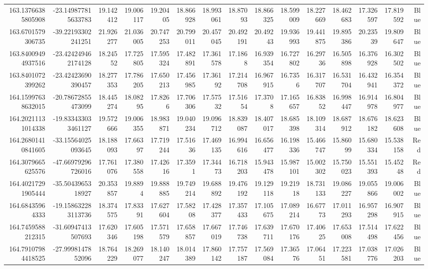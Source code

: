 \begin{center}
\begin{longtable}{rrrrrrrrrrrrrrr}
163.13766385805908 & -23.149877815633783 & 19.142412 & 19.006117 & 19.20405 & 18.866928 & 18.993061 & 18.87093 & 18.866325 & 18.599009 & 18.227669 & 18.462683 & 17.326597 & 17.819592 & Blue \\
163.6701579306735 & -39.22193302241251 & 21.926277 & 21.036005 & 20.747253 & 20.799011 & 20.457045 & 20.492191 & 20.49243 & 19.936993 & 19.441875 & 19.895386 & 20.23539 & 19.809647 & Blue \\
163.84009494937516 & -23.424249462174128 & 18.24552 & 17.725805 & 17.595324 & 17.482891 & 17.361578 & 17.1868 & 16.939354 & 16.727802 & 16.29736 & 16.505898 & 16.376928 & 16.302502 & Blue \\
163.8401072399262 & -23.42423690390457 & 18.277353 & 17.786205 & 17.650213 & 17.456985 & 17.36192 & 17.214708 & 16.967915 & 16.7356 & 16.317707 & 16.531704 & 16.432941 & 16.354372 & Blue \\
164.15997638632015 & -20.78672855473099 & 18.445274 & 18.08295 & 17.8266 & 17.706306 & 17.57532 & 17.51654 & 17.3708 & 17.165657 & 16.83852 & 16.998447 & 16.914978 & 16.804977 & Blue \\
164.20211131014338 & -19.833433033461127 & 19.572666 & 19.006355 & 18.983871 & 19.040234 & 19.096712 & 18.839087 & 18.407017 & 18.685398 & 18.109314 & 18.687912 & 18.676182 & 18.623608 & Blue \\
164.26801410841605 & -33.15564025093645 & 18.188093 & 17.66397 & 17.719244 & 17.51636 & 17.469135 & 16.994616 & 16.656477 & 16.198336 & 15.466747 & 15.86099 & 15.680334 & 15.538158 & Red \\
164.3079665625576 & -47.66979296726016 & 17.761076 & 17.380558 & 17.42616 & 17.3591 & 17.34473 & 16.718203 & 15.943478 & 15.987101 & 15.002302 & 15.750023 & 15.551393 & 15.45248 & Red \\
164.40217291905444 & -35.5043965318927 & 20.353857 & 19.8894 & 19.888885 & 19.749214 & 19.688892 & 19.476192 & 19.129118 & 19.21918 & 18.731133 & 19.086227 & 19.055866 & 19.006002 & Blue \\
164.68435964333 & -19.158632283113736 & 18.374575 & 17.83391 & 17.627604 & 17.58208 & 17.428377 & 17.357433 & 17.105675 & 17.089214 & 16.67773 & 17.011293 & 16.957298 & 16.907915 & Blue \\
164.7459588212315 & -31.60947413507693 & 17.620346 & 17.605198 & 17.571579 & 17.658857 & 17.667019 & 17.746738 & 17.639711 & 17.670176 & 17.40625 & 17.653008 & 17.514498 & 17.622456 & Blue \\
164.79107984418525 & -27.9998147852096 & 18.764229 & 18.269077 & 18.140247 & 18.014389 & 17.860142 & 17.757187 & 17.569084 & 17.36576 & 17.06451 & 17.223581 & 17.038776 & 17.026203 & Blue \\

\end{longtable}
\end{center}
